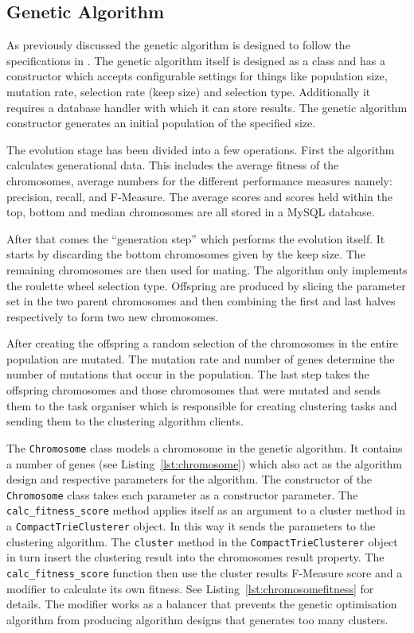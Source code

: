\subsection{Genetic Algorithm}

As previously discussed the genetic algorithm is designed to follow the specifications in \cite{Goldberg1989,Negnevitsky2002,Haupt2004a}. The genetic algorithm itself is designed as a class and has a constructor which accepts configurable settings for things like population size, mutation rate, selection rate (keep size) and selection type. Additionally it requires a database handler with which it can store results. The genetic algorithm constructor generates an initial population of the specified size.

The evolution stage has been divided into a few operations. First the algorithm calculates generational data. This includes the average fitness of the chromosomes, average numbers for the different performance measures namely: precision, recall, and F-Measure. The average scores and scores held within the top, bottom and median chromosomes are all stored in a MySQL database.

After that comes the ``generation step'' which performs the evolution itself. It starts by discarding the bottom chromosomes given by the keep size. The remaining chromosomes are then used for mating. The algorithm only implements the roulette wheel selection type. Offspring are produced by slicing the parameter set in the two parent chromosomes and then combining the first and last halves respectively to form two new chromosomes.

After creating the offspring a random selection of the chromosomes in the entire population are mutated. The mutation rate and number of genes determine the number of mutations that occur in the population. The last step takes the offspring chromosomes and those chromosomes that were mutated and sends them to the task organiser which is responsible for creating clustering tasks and sending them to the clustering algorithm clients.

The \texttt{Chromosome} class models a chromosome in the genetic algorithm. It contains a number of genes (see Listing~\ref{lst:chromosome}) which also act as the algorithm design and respective parameters for the \CTC algorithm. The constructor of the \texttt{Chromosome} class takes each parameter as a constructor parameter. The \texttt{calc\_fitness\_score} method applies itself as an argument to a cluster method in a \texttt{CompactTrieClusterer} object. In this way it sends the \CTC parameters to the clustering algorithm. The \texttt{cluster} method in the \texttt{CompactTrieClusterer} object in turn insert the clustering result into the chromosomes result property. The \texttt{calc\_fitness\_score} function then use the cluster results F-Measure score and a modifier to calculate its own fitness. See Listing~\ref{lst:chromosomefitness} for details. The modifier works as a balancer that prevents the genetic optimisation algorithm from producing algorithm designs that generates too many clusters.

